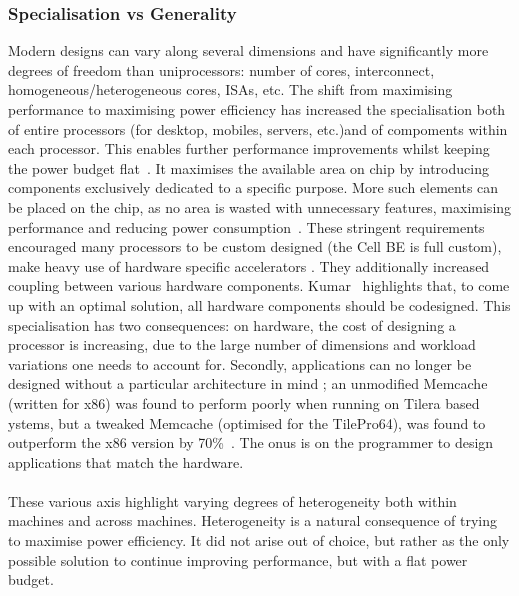 \subsubsection{Specialisation vs Generality} 
 Modern designs can vary along several dimensions and have significantly
more degrees of freedom than uniprocessors: number of cores, interconnect, 
homogeneous/heterogeneous cores, ISAs, etc. The shift from maximising 
performance to maximising power efficiency has increased
the specialisation both of entire processors (for desktop, mobiles,
servers, etc.)and of compoments within each processor. This enables further
performance improvements whilst keeping the power budget flat~\cite{borkar2011future}. It maximises the available area on chip by introducing
components exclusively dedicated to a specific purpose. More
such elements can be placed on the chip, as no area is wasted
with unnecessary features, maximising performance and reducing
power consumption~\cite{borkar2011future}.  
These stringent requirements encouraged many processors to be custom designed
(the Cell BE is full custom), make heavy use of hardware specific accelerators \cite{kahle2005cell}. They additionally increased coupling between various hardware components.
Kumar~\cite{1431574} highlights that, to come up with an optimal solution, all hardware components should be codesigned.  This specialisation has two consequences: 
on hardware, the cost of designing a processor is increasing, due 
to the large number of dimensions and workload variations one needs to account for. 
Secondly, applications can no longer be designed without a particular architecture in mind ; an unmodified Memcache (written for x86) was found to perform poorly when  running on Tilera based ystems, but a tweaked Memcache (optimised for the TilePro64),  was found to outperform the x86 version by 70\%~\cite{berezecki2011manycore}. The onus is on the programmer to design applications that match the hardware.



\paragraph{}  These various axis highlight varying degrees of heterogeneity both within
machines and across machines. Heterogeneity is a natural consequence of 
trying to maximise power efficiency. It did not arise out of choice,  but rather as
the only possible solution to continue improving performance, but with 
a flat power budget. 

